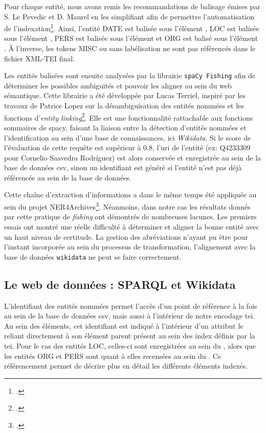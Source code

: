	Pour chaque entité, nous avons remis les recommandations de balisage émises par S. Le Pevedic et D. Maurel en les simplifiant afin de permettre l'automatisation de l'indexation\footcite{lepevedicRetourAnnotationsEntites2016a}. Ainsi, l'entité DATE est balisée sous l'élément , LOC est balisée sous l'élément , PERS est balisée sous l'élément  et ORG est balisé sous l'élément . À l'inverse, les tokens MISC ou sans labélisation ne sont pas référencés dans le fichier XML-TEI final.\newpar
	
	Les entités balisées sont ensuite analysées par la librairie \texttt{spaCy Fishing} afin de déterminer les possibles ambiguïtés et pouvoir les aligner au sein du web sémantique. Cette librairie a été développée par Lucas Terriel, inspiré par les travaux de Patrice Lopez sur la désambiguïsation des entités nommées et les fonctions d'\textit{entity linking}\footcite{terrielSpaCyFishing2022}. Elle est une fonctionnalité rattachable aux fonctions sommaires de \gls{spacy}, faisant la liaison entre la détection d'entités nommées et l'identification au sein d'une base de connaissances, ici \textit{Wikidata}. Si le score de l'évaluation de cette requête est supérieur à 0.8, l'\gls{uri} de l'entité (ex: Q4233309 pour Cornelio Saavedra Rodríguez) est alors conservée et enregistrée au sein de la base de données \gls{csv}, sinon un identifiant est généré si l'entité n'est pas déjà référencée au sein de la base de données.
	
	Cette chaîne d'extraction d'informations a dans le même temps été appliquée au sein du projet NER4Archives\footcite{clavaudNER4ArchivesNamedEntity2022}. Néanmoins, dans notre cas les résultats donnés par cette pratique de \textit{fishing} ont démontrés de nombreuses lacunes. Les premiers essais ont montré une réelle difficulté à déterminer et aligner la bonne entité avec un haut niveau de certitude. La gestion des abréviations n'ayant pu être pour l'instant incorporée au sein du processus de transformation, l'alignement avec la base de données \texttt{wikidata} ne peut se faire correctement.
	
	\subsection{Le web de données : SPARQL et Wikidata}
	
	L'identifiant des entités nommées permet l'accès d'un point de référence à la fois au sein de la base de données \gls{csv}, mais aussi à l'intérieur de notre encodage \gls{tei}. Au sein des éléments, cet identifiant est indiqué à l'intérieur d'un attribut  le reliant directement à son élément parent présent au sein des index définis par la \gls{tei}. Pour le cas des entités LOC, celles-ci sont enregistrées au sein du , alors que les entités ORG et PERS sont quant à elles recensées au sein du . Ce référencement permet de décrire plus en détail les différents éléments indexés.
	

